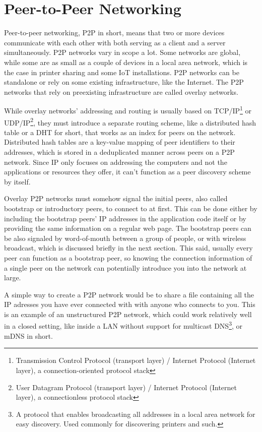 \section{Peer-to-Peer Networking}
Peer-to-peer networking, P2P in short, means that two or more devices communicate with each other with both serving as a client and a server simultaneously. P2P networks vary in scope a lot. Some networks are global, while some are as small as a couple of devices in a local area network, which is the case in printer sharing and some IoT installations. P2P networks can be standalone or rely on some existing infrastructure, like the Internet. The P2P networks that rely on preexisting infrastructure are called overlay networks.

While overlay networks' addressing and routing is usually based on TCP/IP\footnote{Transmission Control Protocol (transport layer) / Internet Protocol (Internet layer), a connection-oriented protocol stack} or UDP/IP\footnote{User Datagram Protocol (transport layer) / Internet Protocol (Internet layer), a connectionless protocol stack}, they must introduce a separate routing scheme, like a distributed hash table or a DHT for short, that works as an index for peers on the network. Distributed hash tables are a key-value mapping of peer identifiers to their addresses, which is stored in a deduplicated manner across peers on a P2P network. Since IP only focuses on addressing the computers and not the applications or resources they offer, it can't function as a peer discovery scheme by itself.

Overlay P2P networks must somehow signal the initial peers, also called bootstrap or introductory peers, to connect to at first. This can be done either by including the bootstrap peers' IP addresses in the application code itself or by providing the same information on a regular web page. The bootstrap peers can be also signaled by word-of-mouth between a group of people, or with wireless broadcast, which is discussed briefly in the next section. This said, usually every peer can function as a bootstrap peer, so knowing the connection information of a single peer on the network can potentially introduce you into the network at large.

A simple way to create a P2P network would be to share a file containing all the IP adresses you have ever connected with with anyone who connects to you. This is an example of an unstructured P2P network, which could work relatively well in a closed setting, like inside a LAN without support for multicast DNS\footnote{A protocol that enables broadcasting all addresses in a local area network for easy discovery. Used commonly for discovering printers and such.}, or mDNS in short.

